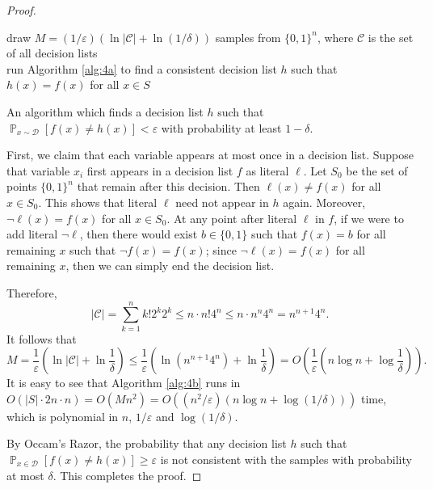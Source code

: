 \documentclass[letterpaper, reqno,11pt]{article}
\newcommand{\PP}{\mathop{{}\mathbb{P}}}
\begin{document}
\begin{enumerate}
\begin{proof}
    \begin{algorithm}
      draw $M = (1/\varepsilon) (\ln|\mathcal C| + \ln(1/\delta))$ samples from $\{ 0, 1 \}^n$, where $\mathcal C$ is the set of all decision lists \\
      run Algorithm \ref{alg:4a} to find a consistent decision list $h$ such that $h(x) = f(x)$ for all $x \in S$ \\
      \caption{An algorithm which finds a decision list $h$ such that $\PP_{x \sim \mathcal D}[f(x) \neq h(x)] < \varepsilon$ with probability at least $1 - \delta$.}
      \label{alg:4b}
    \end{algorithm}

    First, we claim that each variable appears at most once in a decision list. Suppose that variable $x_i$ first appears in a decision list $f$ as literal $\ell$. Let $S_0$ be the set of points $\{ 0, 1 \}^n$ that remain after this decision. Then $\ell(x) \neq f(x)$ for all $x \in S_0$. This shows that literal $\ell$ need not appear in $h$ again. Moreover, $\neg \ell(x) = f(x)$ for all $x \in S_0$. At any point after literal $\ell$ in $f$, if we were to add literal $\neg \ell$, then there would exist $b \in \{ 0, 1 \}$ such that $f(x) = b$ for all remaining $x$ such that $\neg f(x) = f(x)$; since $\neg \ell(x) = f(x)$ for all remaining $x$, then we can simply end the decision list.
    
    Therefore,
    $$ |\mathcal C| = \sum_{k = 1}^n k! 2^k 2^k \leq n \cdot n! 4^n \leq n \cdot n^n 4^n = n^{n + 1} 4^n. $$
    It follows that
    $$ M = \frac{1}{\varepsilon} \left(\ln |\mathcal C| + \ln \frac{1}{\delta}\right) \leq \frac{1}{\varepsilon} \left(\ln \left(n^{n + 1} 4^n\right) + \ln \frac{1}{\delta}\right) = O\left(\frac{1}{\varepsilon}\left(n \log n + \log \frac{1}{\delta}\right)\right). $$
    It is easy to see that Algorithm \ref{alg:4b} runs in $O(|S| \cdot 2n \cdot n) = O(Mn^2) = O((n^2/\varepsilon)(n \log n + \log(1/\delta)))$ time, which is polynomial in $n$, $1/\varepsilon$ and $\log(1/\delta)$.

    By Occam's Razor, the probability that any decision list $h$ such that $\PP_{x \in \mathcal D}[f(x) \neq h(x)] \geq \varepsilon$ is not consistent with the samples with probability at most $\delta$. This completes the proof.
  \end{proof}
\end{enumerate}
\end{document}
